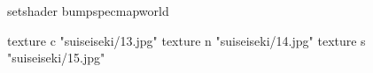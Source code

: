 setshader bumpspecmapworld

    texture c "suiseiseki/13.jpg"
    texture n "suiseiseki/14.jpg"
    texture s "suiseiseki/15.jpg"

